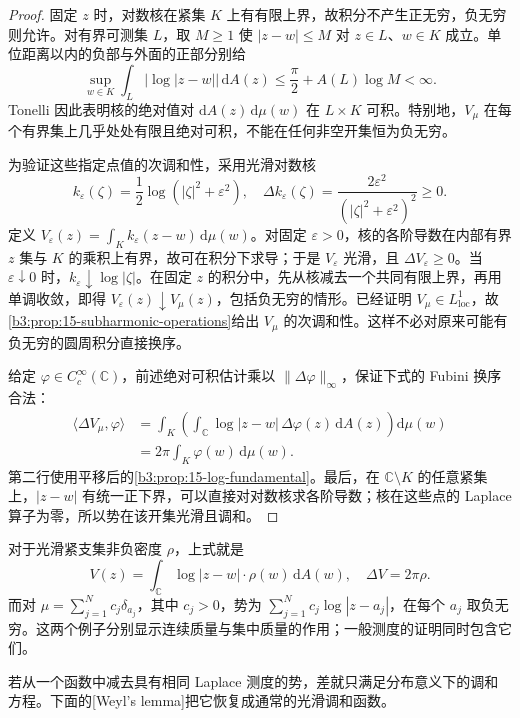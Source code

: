 \begin{proof}
固定 \(z\) 时，对数核在紧集 \(K\) 上有有限上界，故积分不产生正无穷，负无穷则允许。对有界可测集 \(L\)，取 \(M\ge1\) 使 \(|z-w|\le M\) 对 \(z\in L\)、\(w\in K\) 成立。单位距离以内的负部与外面的正部分别给
\[
 \sup_{w\in K}\int_L|\log|z-w||\,\mathrm{d}A(z)
 \le\frac\pi2+A(L)\log M<\infty.
\]
Tonelli 因此表明核的绝对值对 \(\mathrm{d}A(z)\,\mathrm{d}\mu(w)\) 在 \(L\times K\) 可积。特别地，\(V_\mu\) 在每个有界集上几乎处处有限且绝对可积，不能在任何非空开集恒为负无穷。

为验证这些指定点值的次调和性，采用光滑对数核
\[
 k_\varepsilon(\zeta)=\frac12\log(|\zeta|^2+\varepsilon^2),
 \quad
 \Delta k_\varepsilon(\zeta)
 =\frac{2\varepsilon^2}{(|\zeta|^2+\varepsilon^2)^2}\ge0.
\]
定义 \(V_\varepsilon(z)=\int_K k_\varepsilon(z-w)\,\mathrm{d}\mu(w)\)。对固定 \(\varepsilon>0\)，核的各阶导数在内部有界 \(z\) 集与 \(K\) 的乘积上有界，故可在积分下求导；于是 \(V_\varepsilon\) 光滑，且 \(\Delta V_\varepsilon\ge0\)。当 \(\varepsilon\downarrow0\) 时，\(k_\varepsilon\downarrow\log|\zeta|\)。在固定 \(z\) 的积分中，先从核减去一个共同有限上界，再用单调收敛，即得 \(V_\varepsilon(z)\downarrow V_\mu(z)\)，包括负无穷的情形。已经证明 \(V_\mu\in L^1_{\mathrm{loc}}\)，故\cref{b3:prop:15-subharmonic-operations}给出 \(V_\mu\) 的次调和性。这样不必对原来可能有负无穷的圆周积分直接换序。

给定 \(\varphi\in C_c^\infty(\mathbb C)\)，前述绝对可积估计乘以 \(\|\Delta\varphi\|_\infty\)，保证下式的 Fubini 换序合法：
\[
 \begin{aligned}
 \langle\Delta V_\mu,\varphi\rangle
 &=\int_K\left(\int_{\mathbb C}\log|z-w|\,\Delta\varphi(z)\,\mathrm{d}A(z)\right)\mathrm{d}\mu(w)\\
 &=2\pi\int_K\varphi(w)\,\mathrm{d}\mu(w).
 \end{aligned}
\]
第二行使用平移后的\cref{b3:prop:15-log-fundamental}。最后，在 \(\mathbb C\setminus K\) 的任意紧集上，\(|z-w|\) 有统一正下界，可以直接对对数核求各阶导数；核在这些点的 Laplace 算子为零，所以势在该开集光滑且调和。
\end{proof}
对于光滑紧支集非负密度 \(\rho\)，上式就是
\[
 V(z)=\int_{\mathbb C}\log|z-w|\cdot\rho(w)\,\mathrm{d}A(w),
 \quad \Delta V=2\pi\rho.
\]
而对 \(\mu=\sum_{j=1}^N c_j\delta_{a_j}\)，其中 \(c_j>0\)，势为 \(\sum_{j=1}^N c_j\log|z-a_j|\)，在每个 \(a_j\) 取负无穷。这两个例子分别显示连续质量与集中质量的作用；一般测度的证明同时包含它们。

\ProseParagraphBreak

若从一个函数中减去具有相同 Laplace 测度的势，差就只满足分布意义下的调和方程。下面的[Weyl's lemma]把它恢复成通常的光滑调和函数。

